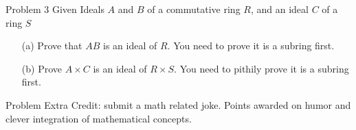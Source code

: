 \documentclass{article}
\theoremstyle{definition}
\begin{document}
\vspace{1cm}








\noindent Problem 3  %
Given Ideals $A$ and $B$ of a commutative ring $R$, and an ideal $C$ of a ring $S$
\begin{itemize}
    \item[(a)]  Prove that $AB$ is an ideal of $R$.  You need to prove it is a subring first.
    \item[(b)] Prove $A\times C$ is an ideal of $R\times S.$ You need to pithily prove it is a subring first.
\end{itemize}

\vspace{1cm}




\noindent Problem Extra Credit: submit a math related joke.  Points awarded on humor and clever integration of mathematical concepts.

\vspace{1cm}
\end{document}
